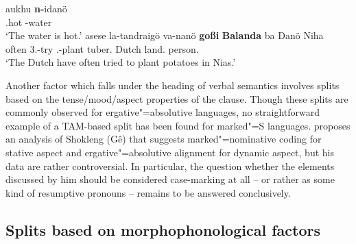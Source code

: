 \begin{exe}\ex\label{NiasBasic}
\begin{xlist}\ex\gll aukhu \textbf{n-}idan\"o\\
\stat{}.hot \mut{}-water\\
\glt `The water is hot.'
\ex\gll asese la-tandraig\"o va-nan\"o \textbf{go\ss i} \textbf{Balanda}  ba Dan\"o Niha\\
often 3\pl{}.\rls{}-try \nmlz{}.\mut{}-plant tuber.\mut{} Dutch \loc{} land.\mut{} person.\mut{}\\
\glt `The Dutch have often tried to plant potatoes in Nias.'
\end{xlist}
\end{exe}

Another factor which falls under the heading  of verbal semantics involves splits based on the tense/mood/aspect properties of the clause. 
Though these splits are commonly observed for ergative"=absolutive languages, no straightforward example of a TAM-based split has been found for marked"=S languages. 
\citet{Urban:1985} proposes an analysis of Shokleng (G\^e) that suggests marked"=nominative coding for stative aspect and ergative"=absolutive alignment for dynamic aspect, but his data are rather controversial. 
In particular, the question whether the elements discussed by him should be considered case-marking at all -- or rather as some kind of resumptive pronouns -- remains to be answered conclusively.  

\subsection{Splits based on morphophonological factors}\label{morphophon}

